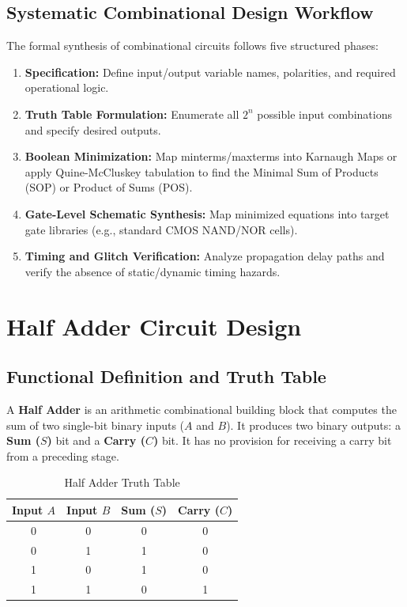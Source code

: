 \subsection{Systematic Combinational Design Workflow}
The formal synthesis of combinational circuits follows five structured phases:
\begin{enumerate}[label=\bfseries\arabic*.]
    \item \textbf{Specification:} Define input/output variable names, polarities, and required operational logic.
    \item \textbf{Truth Table Formulation:} Enumerate all $2^n$ possible input combinations and specify desired outputs.
    \item \textbf{Boolean Minimization:} Map minterms/maxterms into Karnaugh Maps or apply Quine-McCluskey tabulation to find the Minimal Sum of Products (SOP) or Product of Sums (POS).
    \item \textbf{Gate-Level Schematic Synthesis:} Map minimized equations into target gate libraries (e.g., standard CMOS NAND/NOR cells).
    \item \textbf{Timing and Glitch Verification:} Analyze propagation delay paths and verify the absence of static/dynamic timing hazards.
\end{enumerate}


\section{Half Adder Circuit Design}
\label{sec:half_adder}

\subsection{Functional Definition and Truth Table}
A \textbf{Half Adder} is an arithmetic combinational building block that computes the sum of two single-bit binary inputs ($A$ and $B$). It produces two binary outputs: a \textbf{Sum ($S$)} bit and a \textbf{Carry ($C$)} bit. It has no provision for receiving a carry bit from a preceding stage.

\begin{table}[htbp]
\centering
\small
\caption{Half Adder Truth Table}
\label{tab:half_adder_truth}
\begin{tabular}{c c c c}
\toprule
\textbf{Input $A$} & \textbf{Input $B$} & \textbf{Sum ($S$)} & \textbf{Carry ($C$)} \\
\midrule
0 & 0 & 0 & 0 \\
0 & 1 & 1 & 0 \\
1 & 0 & 1 & 0 \\
1 & 1 & 0 & 1 \\
\bottomrule
\end{tabular}
\end{table}

